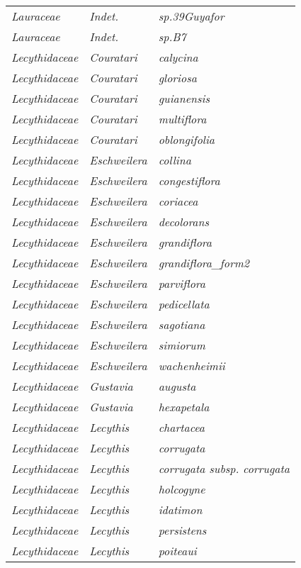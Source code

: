 \documentclass[fleqn,10pt]{ArtEcoFoG} %
\renewenvironment{table}{\begin{table*}}{\end{table*}\ignorespacesafterend}
\begin{document}
\begin{table}
\begin{tabular}[t]{lll}
\em{Lauraceae} & \em{Indet.} & \em{sp.39Guyafor}\\
\em{Lauraceae} & \em{Indet.} & \em{sp.B7}\\
\addlinespace
\em{Lecythidaceae} & \em{Couratari} & \em{calycina}\\
\em{Lecythidaceae} & \em{Couratari} & \em{gloriosa}\\
\em{Lecythidaceae} & \em{Couratari} & \em{guianensis}\\
\em{Lecythidaceae} & \em{Couratari} & \em{multiflora}\\
\em{Lecythidaceae} & \em{Couratari} & \em{oblongifolia}\\
\addlinespace
\em{Lecythidaceae} & \em{Eschweilera} & \em{collina}\\
\em{Lecythidaceae} & \em{Eschweilera} & \em{congestiflora}\\
\em{Lecythidaceae} & \em{Eschweilera} & \em{coriacea}\\
\em{Lecythidaceae} & \em{Eschweilera} & \em{decolorans}\\
\em{Lecythidaceae} & \em{Eschweilera} & \em{grandiflora}\\
\addlinespace
\em{Lecythidaceae} & \em{Eschweilera} & \em{grandiflora\_form2}\\
\em{Lecythidaceae} & \em{Eschweilera} & \em{parviflora}\\
\em{Lecythidaceae} & \em{Eschweilera} & \em{pedicellata}\\
\em{Lecythidaceae} & \em{Eschweilera} & \em{sagotiana}\\
\em{Lecythidaceae} & \em{Eschweilera} & \em{simiorum}\\
\addlinespace
\em{Lecythidaceae} & \em{Eschweilera} & \em{wachenheimii}\\
\em{Lecythidaceae} & \em{Gustavia} & \em{augusta}\\
\em{Lecythidaceae} & \em{Gustavia} & \em{hexapetala}\\
\em{Lecythidaceae} & \em{Lecythis} & \em{chartacea}\\
\em{Lecythidaceae} & \em{Lecythis} & \em{corrugata}\\
\addlinespace
\em{Lecythidaceae} & \em{Lecythis} & \em{corrugata subsp. corrugata}\\
\em{Lecythidaceae} & \em{Lecythis} & \em{holcogyne}\\
\em{Lecythidaceae} & \em{Lecythis} & \em{idatimon}\\
\em{Lecythidaceae} & \em{Lecythis} & \em{persistens}\\
\em{Lecythidaceae} & \em{Lecythis} & \em{poiteaui}\\

\end{tabular}
\end{table}
\end{document}
